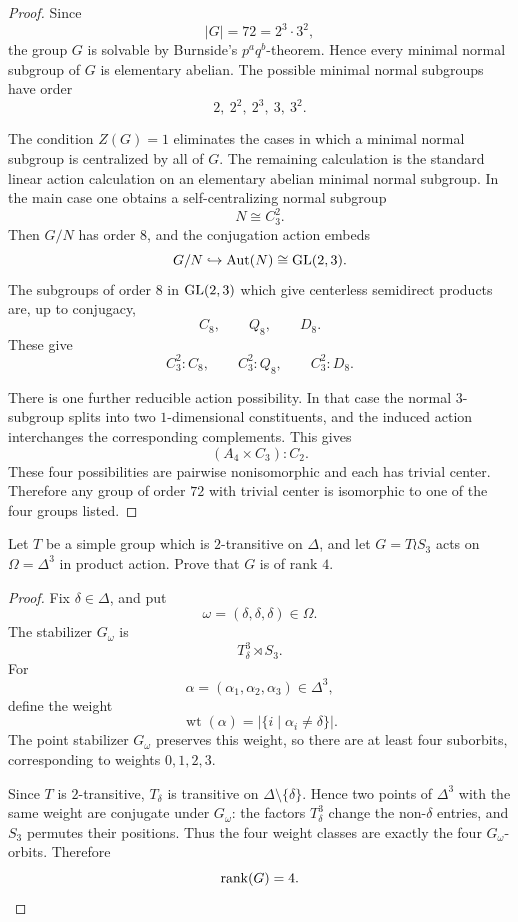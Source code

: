 \begin{proof}
Since
\[
    |G|=72=2^3\cdot 3^2,
\]
the group \(G\) is solvable by Burnside's \(p^a q^b\)-theorem. Hence every
minimal normal subgroup of \(G\) is elementary abelian. The possible minimal
normal subgroups have order
\[
    2,\ 2^2,\ 2^3,\ 3,\ 3^2.
\]

The condition \(Z(G)=1\) eliminates the cases in which a minimal normal subgroup
is centralized by all of \(G\). The remaining calculation is the standard
linear action calculation on an elementary abelian minimal normal subgroup. In
the main case one obtains a self-centralizing normal subgroup
\[
    N\cong C_3^2.
\]
Then \(G/N\) has order \(8\), and the conjugation action embeds
\[
    G/N\hookrightarrow \operatorname{Aut}(N)\cong \operatorname{GL}(2,3).
\]
The subgroups of order \(8\) in \(\operatorname{GL}(2,3)\) which give centerless semidirect
products are, up to conjugacy,
\[
    C_8,\qquad Q_8,\qquad D_8.
\]
These give
\[
    C_3^2:C_8,\qquad
    C_3^2:Q_8,\qquad
    C_3^2:D_8.
\]

There is one further reducible action possibility. In that case the normal
\(3\)-subgroup splits into two \(1\)-dimensional constituents, and the induced
action interchanges the corresponding complements. This gives
\[
    (A_4\times C_3):C_2.
\]
These four possibilities are pairwise nonisomorphic and each has trivial
center. Therefore any group of order \(72\) with trivial center is isomorphic
to one of the four groups listed.
\end{proof}

\begin{exercise}
Let \(T\) be a simple group which is \(2\)-transitive on \(\Delta\), and let
\(G = T \wr S_3\) acts on \(\Omega = \Delta^3\) in product action. Prove that
\(G\) is of rank \(4\).
\end{exercise}

\begin{proof}
Fix \(\delta\in\Delta\), and put
\[
    \omega=(\delta,\delta,\delta)\in\Omega.
\]
The stabilizer \(G_\omega\) is
\[
    T_\delta^3\rtimes S_3.
\]
For
\[
    \alpha=(\alpha_1,\alpha_2,\alpha_3)\in\Delta^3,
\]
define the weight
\[
    \operatorname{wt}(\alpha)
    =
    |\{i\mid \alpha_i\neq \delta\}|.
\]
The point stabilizer \(G_\omega\) preserves this weight, so there are at least
four suborbits, corresponding to weights \(0,1,2,3\).

Since \(T\) is \(2\)-transitive, \(T_\delta\) is transitive on
\(\Delta\setminus\{\delta\}\). Hence two points of \(\Delta^3\) with the same
weight are conjugate under \(G_\omega\): the factors \(T_\delta^3\) change the
non-\(\delta\) entries, and \(S_3\) permutes their positions. Thus the four
weight classes are exactly the four \(G_\omega\)-orbits. Therefore
\[
    \operatorname{rank}(G)=4.
\]
\end{proof}

